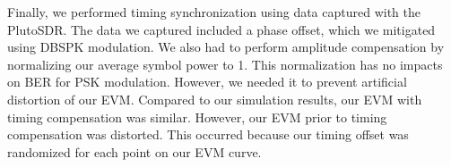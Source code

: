 \documentclass{article}
\begin{document}
Finally, we performed timing synchronization using data captured with the PlutoSDR. The data we captured included a phase offset, which we mitigated using DBSPK modulation. We also had to perform amplitude compensation by normalizing our average symbol power to 1. This normalization has no impacts on BER for PSK modulation. However, we needed it to prevent artificial distortion of our EVM. Compared to our simulation results, our EVM with timing compensation was similar. However, our EVM prior to timing compensation was distorted. This occurred because our timing offset was randomized for each point on our EVM curve.
\end{document}
